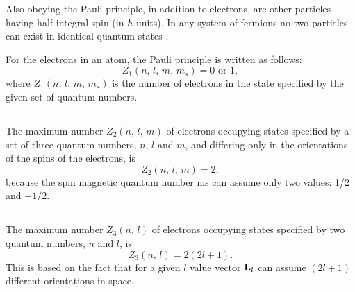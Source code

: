 Also obeying the Pauli principle, in addition to electrons, are other particles having half-integral spin (in $\hbar$ units). In any system of fermions  no two particles can exist in identical quantum states .

For the electrons in an atom, the Pauli principle is written as follows:
\begin{equation*}%
Z_{1} (n,\, l, \, m,\, m_{s}) = 0 \text{ or } 1,
\end{equation*}
where $Z_{1} (n,\, l, \, m,\, m_{s})$ is the number of electrons in the state specified by the given set of quantum numbers.

\subsection{}\label{39.3.2} The maximum number $Z_{2} (n,\, l, \, m)$ of electrons occupying states specified by a set of three quantum numbers, $n$, $l$ and $m$, and differing only in the orientations of the spins of the electrons, is
\begin{equation*}%
Z_{2} (n,\, l, \, m) = 2,
\end{equation*}
because the spin magnetic quantum number ms can assume only
two values: 1/2 and $-1/2$.

\subsection{}\label{39.3.3} The maximum number $Z_{3} (n,\,l)$ of electrons occupying states specified by two quantum numbers, $n$ and $l$, is
\begin{equation*}%
Z_{3} (n,\, l) = 2 (2l + 1).
\end{equation*}
This is based on the fact that for a given $l$ value vector $\vb{L}_{l}$ can assume $(2l + 1)$ different orientations in space.

